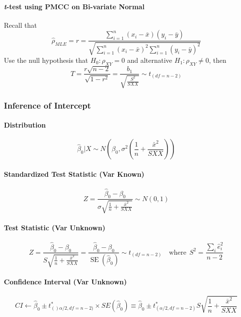 \documentclass[11pt]{article}
\begin{document}
\paragraph{\color{Thistle} \textit{t}-test using PMCC on Bi-variate Normal \color{Black}}

Recall that 
\begin{equation*}
    \hat{\rho}_{MLE} = r=\frac{\sum_{i=1}^{n}\left(x_{i}-\bar{x}\right)\left(y_{i}-\bar{y}\right)}{\sqrt{\sum_{i=1}^{n}\left(x_{i}-\bar{x}\right)^{2} \sum_{i=1}^{n}\left(y_{i}-\bar{y}\right)^{2}}}
\end{equation*}
Use the null hypothesis that $H_0: \rho_{XY} = 0$ and alternative $H_1: \rho_{XY} \neq 0$, then
\begin{equation*}
    T=\frac{r \sqrt{n-2}}{\sqrt{1-r^{2}}}=\frac{b_{1}}{\sqrt{\frac{S^{2}}{S X X}}} \sim t_{(df = n-2)}
\end{equation*}


\subsubsection{Inference of Intercept}
\paragraph{Distribution}
\begin{equation*}
    \hat{\beta}_{0} | X \sim N\left(\beta_{0}, \sigma^{2}\left(\frac{1}{n}+\frac{\bar{x}^{2}}{S X X}\right)\right)
\end{equation*}
\paragraph{Standardized Test Statistic (Var Known)}
\begin{equation*}
    Z=\frac{\hat{\beta}_{0}-\beta_{0}}{\sigma \sqrt{\frac{1}{n}+\frac{\bar{x}^{2}}{S X X}}} \sim N(0,1)
\end{equation*}
\paragraph{Test Statistic (Var Unknown)}
\begin{equation*}
    Z=\frac{\hat{\beta}_{0}-\beta_{0}}{S \sqrt{\frac{1}{n}+\frac{\bar{x}^{2}}{S X X}}} = \frac{\hat{\beta}_{0}-\beta_{0}}{\operatorname{SE}\left(\hat{\beta}_{0}\right)} \sim t_{(df=n-2)} \quad \text{where}~~ S^2 = \frac{\sum_i \hat{e}_i^2}{n-2} 
\end{equation*}
\paragraph{Confidence Interval (Var Unknown)}
\begin{equation*}
    CI \gets \hat{\beta}_0 \pm t^\ast_{()\alpha/2, df=n-2)} \times SE(\hat{\beta}_0) \equiv \hat{\beta}_0 \pm t^\ast_{(\alpha/2, df=n-2)} S\sqrt{\frac{1}{n}+\frac{\bar{x}^{2}}{S X X}}
\end{equation*}
\end{document}
